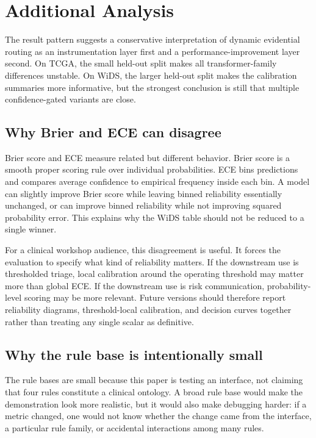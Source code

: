 \documentclass{article}
\begin{document}
\section{Additional Analysis}
\label{sec:additional_analysis}

The result pattern suggests a conservative interpretation of dynamic evidential routing as an instrumentation layer first and a performance-improvement layer second. On TCGA, the small held-out split makes all transformer-family differences unstable. On WiDS, the larger held-out split makes the calibration summaries more informative, but the strongest conclusion is still that multiple confidence-gated variants are close.

\subsection{Why Brier and ECE can disagree}

Brier score and ECE measure related but different behavior. Brier score is a smooth proper scoring rule over individual probabilities. ECE bins predictions and compares average confidence to empirical frequency inside each bin. A model can slightly improve Brier score while leaving binned reliability essentially unchanged, or can improve binned reliability while not improving squared probability error. This explains why the WiDS table should not be reduced to a single winner.

For a clinical workshop audience, this disagreement is useful. It forces the evaluation to specify what kind of reliability matters. If the downstream use is thresholded triage, local calibration around the operating threshold may matter more than global ECE. If the downstream use is risk communication, probability-level scoring may be more relevant. Future versions should therefore report reliability diagrams, threshold-local calibration, and decision curves together rather than treating any single scalar as definitive.

\subsection{Why the rule base is intentionally small}

The rule bases are small because this paper is testing an interface, not claiming that four rules constitute a clinical ontology. A broad rule base would make the demonstration look more realistic, but it would also make debugging harder: if a metric changed, one would not know whether the change came from the interface, a particular rule family, or accidental interactions among many rules.
\end{document}
